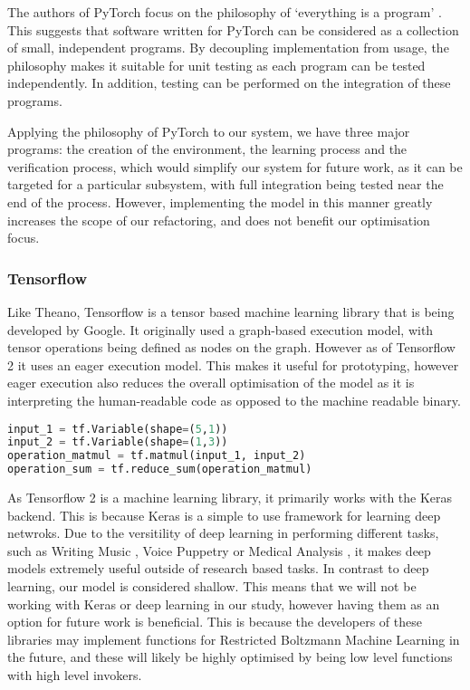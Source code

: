 The authors of PyTorch focus on the philosophy of `everything is a program' \cite{paszke2019pytorch}.
This suggests that software written for PyTorch can be considered as a collection of small, independent programs.
By decoupling implementation from usage, the philosophy makes it suitable for unit testing as each program can be tested independently.
In addition, testing can be performed on the integration of these programs.

Applying the philosophy of PyTorch to our system, we have three major programs: the creation of the environment, the learning process and the verification process, which would simplify our system for future work, as it can be targeted for a particular subsystem, with full integration being tested near the end of the process.
However, implementing the model in this manner greatly increases the scope of our refactoring, and does not benefit our optimisation focus.

\subsubsection{Tensorflow}

Like Theano, Tensorflow is a tensor based machine learning library that is being developed by Google.
It originally used a graph-based execution model, with tensor operations being defined as nodes on the graph.
However as of Tensorflow 2 it uses an eager execution model.
This makes it useful for prototyping, however eager execution also reduces the overall optimisation of the model as it is interpreting the human-readable code as opposed to the machine readable binary.
\begin{minipage}{\linewidth}
\begin{lstlisting}[caption=Tensorflow Code Example, label=code:tensorflow1, language=python]
input_1 = tf.Variable(shape=(5,1))
input_2 = tf.Variable(shape=(1,3))
operation_matmul = tf.matmul(input_1, input_2)
operation_sum = tf.reduce_sum(operation_matmul)

\end{lstlisting}
\end{minipage}

As Tensorflow 2 is a machine learning library, it primarily works with the Keras backend.
This is because Keras is a simple to use framework for learning deep netwroks.
Due to the versitility of deep learning in performing different tasks, such as Writing Music \citep{dhariwal2020jukebox}, Voice Puppetry \citep{deepneuralvoicepuppetry} or Medical Analysis \citep{coviddeepprognosticdiagnostic}, it makes deep models extremely useful outside of research based tasks.
In contrast to deep learning, our model is considered shallow.
This means that we will not be working with Keras or deep learning in our study, however having them as an option for future work is beneficial.
This is because the developers of these libraries may implement functions for Restricted Boltzmann Machine Learning in the future, and these will likely be highly optimised by being low level functions with high level invokers.

